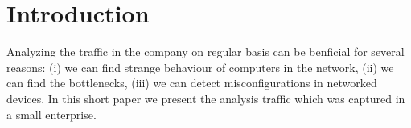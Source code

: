 \section{Introduction}
\label{section:introduction}

Analyzing the traffic in the company on regular basis can be 
benficial for several reasons: (i) we can find strange behaviour 
of computers in the network, (ii) we can find the bottlenecks, 
(iii) we can detect misconfigurations in networked devices. 
In this short paper we present the analysis traffic which was captured in a small 
enterprise.
